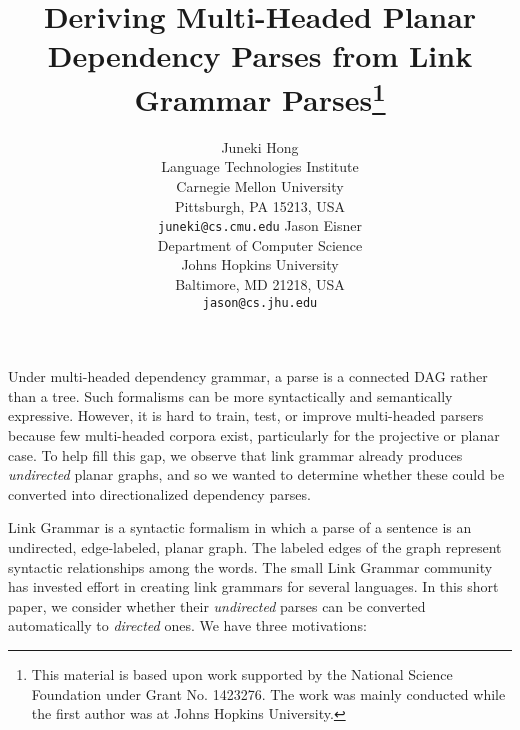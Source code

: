 \documentclass[11pt]{article}
\title{Deriving Multi-Headed Planar Dependency Parses from Link
  Grammar Parses\thanks{This material is based upon work supported by the National
    Science Foundation under Grant No. 1423276.  The work was mainly
    conducted while the first author was at Johns Hopkins
    University.\noteJE{anyone else to thank?}}}
\author{
  Juneki Hong \\
  Language Technologies Institute\\
  Carnegie Mellon University\\
  Pittsburgh, PA 15213, USA\\
  {\texttt{juneki@cs.cmu.edu}}
  \And
  Jason Eisner\\
  Department of Computer Science\\
  Johns Hopkins University\\
  Baltimore, MD 21218, USA \\
  {\texttt{jason@cs.jhu.edu}}
}
\date{}
\begin{document}
\maketitle

Under multi-headed dependency grammar, a parse is a connected DAG rather than a tree.  Such formalisms can be more syntactically and semantically expressive.  However, it is hard to train, test, or improve multi-headed parsers because few multi-headed corpora exist, particularly for the projective or planar case. 
To help fill this gap, we observe that link grammar already produces {\em undirected} planar graphs, and so we wanted to determine whether these could be converted into directionalized dependency parses. 

Link Grammar \cite{sleator-temperley-1991} is a syntactic formalism in which a parse of a sentence is an undirected, edge-labeled, planar graph.  The labeled edges of the graph represent syntactic relationships among the words.  
The small Link Grammar community has invested effort in creating link grammars for several languages.  In this short paper, we consider whether their {\em undirected} parses can be converted automatically to {\em directed} ones.  We have three motivations:
\end{document}
